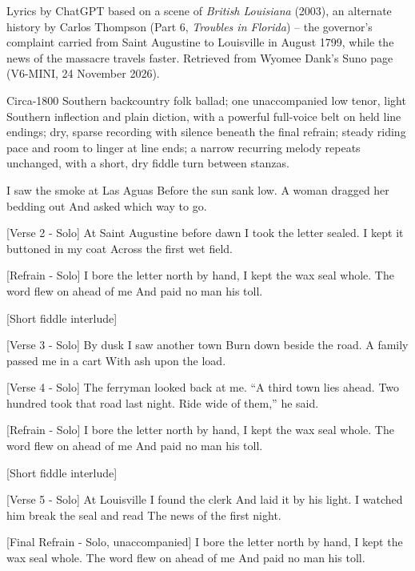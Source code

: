 \begin{notes}
Lyrics by ChatGPT based on a scene of \emph{British Louisiana} (2003), an alternate history by Carlos Thompson (Part 6, \emph{Troubles in Florida}) -- the governor's complaint carried from Saint Augustine to Louisville in August 1799, while the news of the massacre travels faster. Retrieved from Wyomee Dank's Suno page (V6-MINI, 24 November 2026).
\end{notes}
\begin{style}
Circa-1800 Southern backcountry folk ballad; one unaccompanied low tenor, light Southern inflection and plain diction, with a powerful full-voice belt on held line endings; dry, sparse recording with silence beneath the final refrain; steady riding pace and room to linger at line ends; a narrow recurring melody repeats unchanged, with a short, dry fiddle turn between stanzas.
\end{style}
\begin{lyrics}
I saw the smoke at Las Aguas
Before the sun sank low.
A woman dragged her bedding out
And asked which way to go.

[Verse 2 - Solo]
At Saint Augustine before dawn
I took the letter sealed.
I kept it buttoned in my coat
Across the first wet field.

[Refrain - Solo]
I bore the letter north by hand,
I kept the wax seal whole.
The word flew on ahead of me
And paid no man his toll.

[Short fiddle interlude]

[Verse 3 - Solo]
By dusk I saw another town
Burn down beside the road.
A family passed me in a cart
With ash upon the load.

[Verse 4 - Solo]
The ferryman looked back at me.
“A third town lies ahead.
Two hundred took that road last night.
Ride wide of them,” he said.

[Refrain - Solo]
I bore the letter north by hand,
I kept the wax seal whole.
The word flew on ahead of me
And paid no man his toll.

[Short fiddle interlude]

[Verse 5 - Solo]
At Louisville I found the clerk
And laid it by his light.
I watched him break the seal and read
The news of the first night.

[Final Refrain - Solo, unaccompanied]
I bore the letter north by hand,
I kept the wax seal whole.
The word flew on ahead of me
And paid no man his toll.
\end{lyrics}

